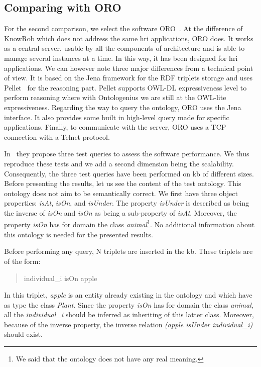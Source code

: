 \subsection{Comparing with ORO}

For the second comparison, we select the software ORO~\cite{lemaignan_2010_oro}. At the difference of KnowRob which does not address the same \acrshort{hri} applications, ORO does. It works as a central server, usable by all the components of architecture and is able to manage several instances at a time. In this way, it has been designed for \acrshort{hri} applications. We can however note three major differences from a technical point of view. It is based on the Jena framework for the RDF triplets storage and uses Pellet~\cite{sirin_2007_pellet} for the reasoning part. Pellet supports OWL-DL expressiveness level to perform reasoning where with Ontologenius we are still at the OWL-lite expressiveness. Regarding the way to query the ontology, ORO uses the Jena \sparql{} interface. It also provides some built in high-level query made for specific applications. Finally, to communicate with the server, ORO uses a TCP connection with a Telnet protocol.

In~\cite{lemaignan_2010_oro} they propose three test queries to assess the software performance. We thus reproduce these tests and we add a second dimension being the scalability. Consequently, the three test queries have been performed on \acrshort{kb} of different sizes. Before presenting the results, let us see the content of the test ontology. This ontology does not aim to be semantically correct. We first have three object properties: \textit{isAt}, \textit{isOn}, and \textit{isUnder}. The property \textit{isUnder} is described as being the inverse of \textit{isOn} and \textit{isOn} as being a sub-property of \textit{isAt}. Moreover, the property \textit{isOn} has for domain the class \textit{animal}\footnote{We said that the ontology does not have any real meaning.}. No additional information about this ontology is needed for the presented results.

Before performing any query, N triplets are inserted in the \acrshort{kb}. These triplets are of the form:

\begin{quote} 
\centering 
individual\_i isOn apple
\end{quote}

In this triplet, \textit{apple} is an entity already existing in the ontology and which have as type the class \textit{Plant}. Since the property \textit{isOn} has for domain the class \textit{animal}, all the \textit{individual\_i} should be inferred as inheriting of this latter class. Moreover, because of the inverse property, the inverse relation \textit{(apple isUnder individual\_i)} should exist.

